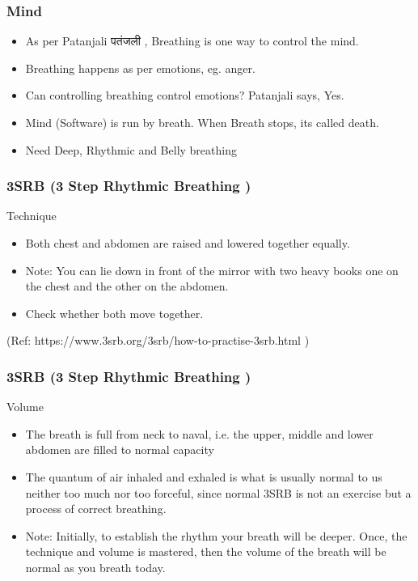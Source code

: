 \begin{frame}[fragile]
\frametitle{Mind}
\begin{itemize}
\item As per Patanjali पतंजली , Breathing is one way to control the mind.
\item Breathing happens as per emotions, eg. anger.
\item Can controlling breathing control emotions? Patanjali says, Yes.
\item Mind (Software) is run by breath. When Breath stops, its called death.
\item Need Deep, Rhythmic and Belly breathing
\end{itemize}
\end{frame}

\begin{frame}[fragile]
\frametitle{3SRB (3 Step Rhythmic Breathing )}

Technique

\begin{itemize}
\item Both chest and abdomen are raised and lowered together equally.
\item Note: You can lie down in front of the mirror with two heavy books one on the chest and the other on the abdomen. 
\item Check whether both move together.
\end{itemize}

\tiny{(Ref: https://www.3srb.org/3srb/how-to-practise-3srb.html )}
\end{frame}

\begin{frame}[fragile]
\frametitle{3SRB (3 Step Rhythmic Breathing )}

Volume

\begin{itemize}
\item The breath is full from neck to naval, i.e. the upper, middle and lower abdomen are filled to normal capacity
\item The quantum of air inhaled and exhaled is what is usually normal to us neither too much nor too forceful, since normal 3SRB is not an exercise but a process of correct breathing. 
\item Note: Initially, to establish the rhythm your breath will be deeper. Once, the technique and volume is mastered, then the volume of the breath will be normal as you breath today.
\end{itemize}
\end{frame}


